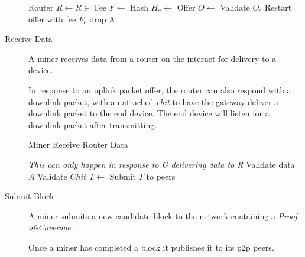 \documentclass[10pt, nonatbib, nocopyrightspace, reprint]{sigplanconf}
\begin{document}
\begin{description}
\begin{algorithm}[!htb]
       {
        Router $R \leftarrow R \in $  \;
        Fee $F \leftarrow $  \;
        Hash $H_a \leftarrow $  \;
        Offer $O \leftarrow $  \;
         {
           {
            Validate $O_c$
             {
               {
                Restart offer with fee $F_c$\;
              }
               {
                drop A \;
              }
            }
          }
        }
      }
    \end{algorithm}
    \FloatBarrier


  \item [Receive Data] A miner receives data from a router on the internet for delivery to a device.

    In response to an uplink packet offer, the router can also respond with a downlink packet, with an attached \emph{chit} to have the gateway deliver a downlink packet to the end device. The end device will listen for a downlink packet after transmitting.

    \begin{algorithm}[!htb]
      \DontPrintSemicolon
      \caption{Miner Receive Router Data}\label{proto:miner.data.receive}

       {
        \emph{This can only happen in response to G delivering data to R}
        Validate data $A$ \;
        Validate $Chit$\;
         \;
        $T \leftarrow $  \;
        Submit $T$ to peers\;
      }
    \end{algorithm}
    \FloatBarrier


  \item [Submit Block] A miner submits a new candidate block to the network containing a \emph{Proof-of-Coverage}.

    Once a miner has completed a block it publishes it to its p2p peers.


\end{description}
\end{document}
